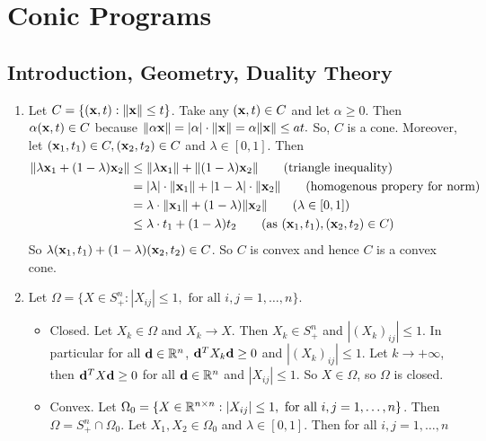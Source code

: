 \section{Conic Programs}
\subsection{Introduction, Geometry, Duality Theory}
\begin{enumerate}
    \item Let \(C = \{(\mathbf{x}, t) : \norm{\mathbf{x}} \leq t\}\). Take any \((\mathbf{x}, t) \in C\) and let \(\alpha \geq 0\). Then \(\alpha(\mathbf{x}, t) \in C\) because \(\norm{\alpha\mathbf{x}} = |\alpha|\cdot \norm{\mathbf{x}} = \alpha \norm{\mathbf{x}} \leq at.\) So, \(C\) is a cone. Moreover, let \((\mathbf{x}_1, t_1) \in C, (\mathbf{x}_2, t_2) \in C\) and \(\lambda \in [0, 1]\). Then
          \begin{align*}
              \norm{\lambda \fx_1 + (1 - \lambda)\fx_2} & \leq \norm{\lambda \fx_1} + \norm{(1 - \lambda)\fx_2} \tag{triangle inequality}                     \\
                                                        & = |\lambda| \cdot \norm{\fx_1} + |1 - \lambda| \cdot \norm{\fx_2} \tag{homogenous propery for norm} \\
                                                        & = \lambda \cdot \norm{\fx_1} + (1 - \lambda) \norm{\fx_2} \tag{\(\lambda \in [0, 1]\)}              \\
                                                        & \leq \lambda \cdot t_1 + (1 - \lambda) t_2 \tag{as \((\fx_1, t_1), (\fx_2, t_2) \in C\)}
          \end{align*}
          So \(\lambda(\mathbf{x}_1, t_1) + (1 - \lambda)(\mathbf{x}_2, t_2) \in C\). So \(C\) is convex and hence \(C\) is a convex cone.
    \item Let \(\Omega = \{X \in S_+^n : |X_{ij}| \leq 1, \text{ for all } i,j = 1, \dots, n\}\).
          \begin{itemize}
              \item Closed. Let \(X_k \in \Omega\) and \(X_k \to X\). Then \(X_k \in S_+^n\) and \(|(X_k)_{ij}| \leq 1\). In particular for all \(\mathbf{d} \in \mathbb{R}^n\), \(\mathbf{d}^T X_k \mathbf{d} \geq 0\) and \(|(X_k)_{ij}| \leq 1\). Let \(k \to +\infty\), then \(\mathbf{d}^T X \mathbf{d} \geq 0\) for all \(\mathbf{d} \in \mathbb{R}^n\) and \(|X_{ij}| \leq 1\). So \(X \in \Omega\), so \(\Omega\) is closed.
              \item Convex. Let \(\Omega_0 = \{X \in \mathbb{R}^{n \times n} : |X_{ij}| \leq 1, \text{ for all } i, j = 1, \dots, n\}\). Then \(\Omega = S_+^n \cap \Omega_0\). Let \(X_1, X_2 \in \Omega_0\) and \(\lambda \in [0, 1]\). Then for all \(i, j = 1, \dots, n\)

\end{itemize}
\end{enumerate}

